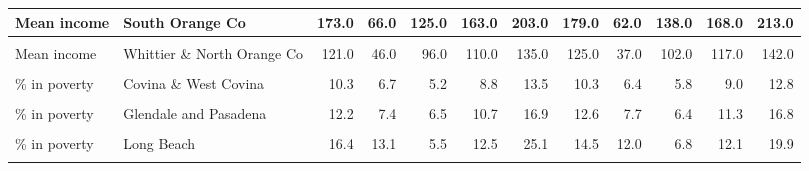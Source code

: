 \begin{table}[!h]
\begin{tabular}[t]{l|>{}l||r|r|r|r|r|r|r|r|r|r}
\hline
Mean income & South Orange Co & 173.0 & 66.0 & 125.0 & 163.0 & 203.0 & 179.0 & 62.0 & 138.0 & 168.0 & 213.0\\
\hline
\cellcolor{gray!6}{Mean income} & \cellcolor{gray!6}{West Los Angeles \& West Beach} & \cellcolor{gray!6}{197.0} & \cellcolor{gray!6}{136.0} & \cellcolor{gray!6}{108.0} & \cellcolor{gray!6}{144.0} & \cellcolor{gray!6}{266.0} & \cellcolor{gray!6}{206.0} & \cellcolor{gray!6}{108.0} & \cellcolor{gray!6}{133.0} & \cellcolor{gray!6}{169.0} & \cellcolor{gray!6}{252.0}\\
\hline
Mean income & Whittier \& North Orange Co & 121.0 & 46.0 & 96.0 & 110.0 & 135.0 & 125.0 & 37.0 & 102.0 & 117.0 & 142.0\\
\hline
\cellcolor{gray!6}{\% in poverty} & \cellcolor{gray!6}{Anaheim} & \cellcolor{gray!6}{9.8} & \cellcolor{gray!6}{6.9} & \cellcolor{gray!6}{4.6} & \cellcolor{gray!6}{8.0} & \cellcolor{gray!6}{13.6} & \cellcolor{gray!6}{10.7} & \cellcolor{gray!6}{6.7} & \cellcolor{gray!6}{5.5} & \cellcolor{gray!6}{9.6} & \cellcolor{gray!6}{14.8}\\
\hline
\hline
\% in poverty & Covina \& West Covina & 10.3 & 6.7 & 5.2 & 8.8 & 13.5 & 10.3 & 6.4 & 5.8 & 9.0 & 12.8\\
\hline
\cellcolor{gray!6}{\% in poverty} & \cellcolor{gray!6}{East Los Angeles} & \cellcolor{gray!6}{19.2} & \cellcolor{gray!6}{9.5} & \cellcolor{gray!6}{11.4} & \cellcolor{gray!6}{18.8} & \cellcolor{gray!6}{25.4} & \cellcolor{gray!6}{16.0} & \cellcolor{gray!6}{7.9} & \cellcolor{gray!6}{10.2} & \cellcolor{gray!6}{15.1} & \cellcolor{gray!6}{21.1}\\
\hline
\% in poverty & Glendale and Pasadena & 12.2 & 7.4 & 6.5 & 10.7 & 16.9 & 12.6 & 7.7 & 6.4 & 11.3 & 16.8\\
\hline
\cellcolor{gray!6}{\% in poverty} & \cellcolor{gray!6}{Hollywood \& Wilshire} & \cellcolor{gray!6}{22.1} & \cellcolor{gray!6}{12.9} & \cellcolor{gray!6}{11.5} & \cellcolor{gray!6}{20.8} & \cellcolor{gray!6}{31.0} & \cellcolor{gray!6}{17.7} & \cellcolor{gray!6}{11.8} & \cellcolor{gray!6}{9.3} & \cellcolor{gray!6}{14.7} & \cellcolor{gray!6}{23.9}\\
\hline
\% in poverty & Long Beach & 16.4 & 13.1 & 5.5 & 12.5 & 25.1 & 14.5 & 12.0 & 6.8 & 12.1 & 19.9\\
\hline
\cellcolor{gray!6}{\% in poverty} & \cellcolor{gray!6}{Riverside, San Bernardino, \& Ontario} & \cellcolor{gray!6}{13.0} & \cellcolor{gray!6}{9.8} & \cellcolor{gray!6}{5.7} & \cellcolor{gray!6}{10.8} & \cellcolor{gray!6}{17.0} & \cellcolor{gray!6}{12.4} & \cellcolor{gray!6}{9.2} & \cellcolor{gray!6}{5.8} & \cellcolor{gray!6}{10.6} & \cellcolor{gray!6}{17.2}\\

\end{tabular}
\end{table}
